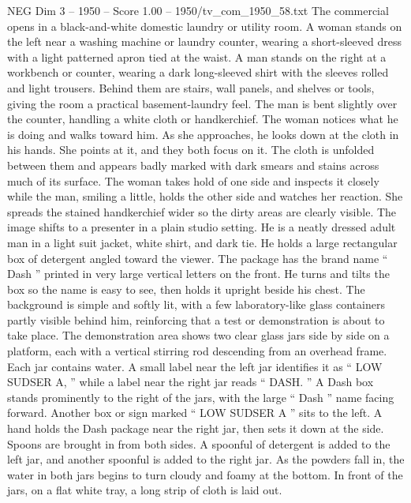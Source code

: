 \begin{textsample}{NEG Dim 3 – 1950 – Score 1.00 – 1950/tv\_com\_1950\_58.txt}  \label{ex:f3_neg_084}
The commercial opens in a black-and-white domestic laundry or utility room.
A woman stands on the left near a washing machine or laundry counter, wearing a short-sleeved dress with a light patterned apron tied at the waist.
A man stands on the right at a workbench or counter, wearing a dark long-sleeved shirt with the sleeves rolled and light trousers.
Behind them are stairs, wall panels, and shelves or tools, giving the room a practical basement-laundry feel.
The man is bent slightly over the counter, handling a white cloth or handkerchief.
The woman notices what he is doing and walks toward him.
As she approaches, he looks down at the cloth in his hands.
She points at it, and they both focus on it.
The cloth is unfolded between them and appears badly marked with dark smears and stains across much of its surface.
The woman takes hold of one side and inspects it closely while the man, smiling a little, holds the other side and watches her reaction.
She spreads the stained handkerchief wider so the dirty areas are clearly visible.
The image shifts to a presenter in a plain studio setting.
He is a neatly dressed adult man in a light suit jacket, white shirt, and dark tie.
He holds a large rectangular box of detergent angled toward the viewer.
The package has the brand name “ Dash ” printed in very large vertical letters on the front.
He turns and tilts the box so the name is easy to see, then holds it upright beside his chest.
The background is simple and softly lit, with a few laboratory-like glass containers partly visible behind him, reinforcing that a test or demonstration is about to take place.
The demonstration area shows two clear glass jars side by side on a platform, each with a vertical stirring rod descending from an overhead frame.
Each jar contains water.
A small label near the left jar identifies it as “ LOW SUDSER A, ” while a label near the right jar reads “ DASH. ” A Dash box stands prominently to the right of the jars, with the large “ Dash ” name facing forward.
Another box or sign marked “ LOW SUDSER A ” sits to the left.
A hand holds the Dash package near the right jar, then sets it down at the side.
Spoons are brought in from both sides.
A spoonful of detergent is added to the left jar, and another spoonful is added to the right jar.
As the powders fall in, the water in both jars begins to turn cloudy and foamy at the bottom.
In front of the jars, on a flat white tray, a long strip of cloth is laid out.

\end{textsample}
